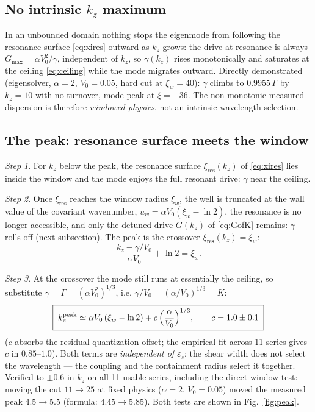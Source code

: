 \documentclass[11pt,a4paper]{article}
\numberwithin{equation}{section}
\theoremstyle{remark}
\newtheorem{step}{Step}[subsection]
\newcommand{\eps}{\varepsilon_s}                 %
\newcommand{\Vo}{V_0}
\newcommand{\kz}{k_z}
\newcommand{\Ceil}{\Gamma}                        %
\newcommand{\Kwn}{K}                              %
\begin{document}
\subsection{No intrinsic $\kz$ maximum}
\label{ssec:nopeak}

In an unbounded domain nothing stops the eigenmode from following the
resonance surface \eqref{eq:xires} outward as $\kz$ grows: the drive at
resonance is always $G_{\max}=\alpha\Vo^2/\gamma$, independent of $\kz$,
so $\gamma(\kz)$ rises monotonically and saturates at the ceiling
\eqref{eq:ceiling} while the mode migrates outward. Directly demonstrated
(eigensolver, $\alpha=2$, $\Vo=0.05$, hard cut at $\xi_w=40$): $\gamma$
climbs to
$0.9955\,\Ceil$ by $\kz=10$ with no turnover, mode peak at $\xi=-36$. The
non-monotonic measured dispersion is therefore \emph{windowed physics},
not an intrinsic wavelength selection.

\subsection{The peak: resonance surface meets the window}
\label{ssec:kzpeak}

\begin{step}
For $\kz$ below the peak, the resonance surface
$\xi_{\mathrm{res}}(\kz)$ of \eqref{eq:xires} lies inside the window and
the mode enjoys the full resonant drive: $\gamma$ near the ceiling.
\end{step}

\begin{step}
Once $\xi_{\mathrm{res}}$ reaches the window radius $\xi_w$, the well is
truncated at the wall value of the covariant wavenumber,
$u_w=\alpha\Vo(\xi_w-\ln2)$, the resonance is no longer accessible, and
only the detuned drive $G(\kz)$ of \eqref{eq:GofK} remains: $\gamma$ rolls
off (next subsection). The peak is the crossover
$\xi_{\mathrm{res}}(\kz)=\xi_w$:
\begin{equation}
\frac{\kz-\gamma/\Vo}{\alpha\Vo}+\ln2=\xi_w .
\end{equation}
\end{step}

\begin{step}
At the crossover the mode still runs at essentially the ceiling, so
substitute $\gamma=\Ceil=(\alpha\Vo^2)^{1/3}$, i.e.
$\gamma/\Vo=(\alpha/\Vo)^{1/3}=\Kwn$:
\begin{equation}
\boxed{\;
\kz^{\mathrm{peak}}\simeq\alpha\Vo\,(\xi_w-\ln2)
+c\,\Bigl(\frac{\alpha}{\Vo}\Bigr)^{1/3},
\qquad c=1.0\pm0.1
\;}
\label{eq:kzpeak}
\end{equation}
($c$ absorbs the residual quantization offset; the empirical fit across
11 series gives $c$ in $0.85$--$1.0$). Both terms are \emph{independent of
$\eps$}: the shear width does not select the wavelength --- the coupling
and the containment radius select it together. Verified to $\pm0.6$ in
$\kz$ on all 11 usable series, including the direct window test: moving
the cut $11\to25$ at fixed physics ($\alpha=2$, $\Vo=0.05$) moved the
measured peak $4.5\to5.5$ (formula: $4.45\to5.85$). Both tests are shown
in Fig.~\ref{fig:peak}.
\end{step}
\end{document}
